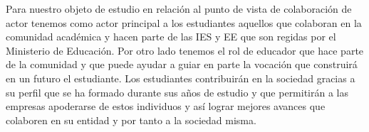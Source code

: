 Para nuestro objeto de estudio en relación al punto de vista de colaboración de actor tenemos como actor principal a los estudiantes aquellos que colaboran en la comunidad académica y hacen parte de las IES y EE que son regidas por el Ministerio de Educación. Por otro lado tenemos el rol de educador que hace parte de la comunidad y que puede ayudar a guiar en parte la vocación que construirá en un futuro el estudiante. Los estudiantes contribuirán en la sociedad gracias a su perfil que se ha formado durante sus años de estudio y que permitirán a las empresas apoderarse de estos individuos y así lograr mejores avances que colaboren en su entidad y por tanto a la sociedad misma.